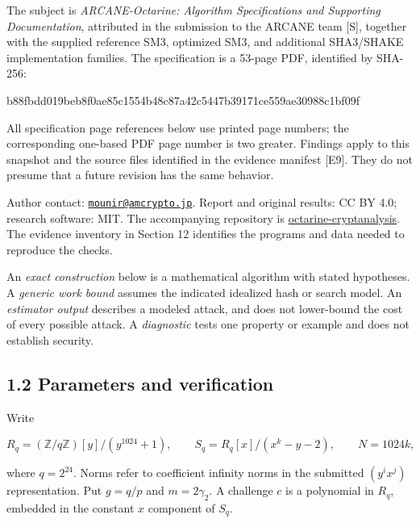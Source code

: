 \documentclass[
  american,
  10pt,
  a4paper,
]{article}
\newenvironment{Shaded}{}{}
\newcommand{\NormalTok}[1]{#1}
\begin{document}
The subject is \emph{ARCANE-Octarine: Algorithm Specifications and
Supporting Documentation}, attributed in the submission to the ARCANE
team {[}S{]}, together with the supplied reference SM3, optimized SM3,
and additional SHA3/SHAKE implementation families. The specification is
a 53-page PDF, identified by SHA-256:

\begin{Shaded}
\begin{Highlighting}[]
\NormalTok{b88fbdd019beb8f0ae85c1554b48c87a42c5447b39171ce559ae30988c1bf09f}
\end{Highlighting}
\end{Shaded}

All specification page references below use printed page numbers; the
corresponding one-based PDF page number is two greater. Findings apply
to this snapshot and the source files identified in the evidence
manifest {[}E9{]}. They do not presume that a future revision has the
same behavior.

Author contact:
\href{mailto:mounir@amcrypto.jp}{\nolinkurl{mounir@amcrypto.jp}}. Report
and original results: CC BY 4.0; research software: MIT. The
accompanying repository is
\href{https://github.com/amcrypto-jp/octarine-cryptanalysis}{octarine-cryptanalysis}.
The evidence inventory in Section 12 identifies the programs and data
needed to reproduce the checks.

An \emph{exact construction} below is a mathematical algorithm with
stated hypotheses. A \emph{generic work bound} assumes the indicated
idealized hash or search model. An \emph{estimator output} describes a
modeled attack, and does not lower-bound the cost of every possible
attack. A \emph{diagnostic} tests one property or example and does not
establish security.

\subsection{1.2 Parameters and
verification}\label{parameters-and-verification}

Write

\[
R_q=(\mathbb Z/q\mathbb Z)[y]/(y^{1024}+1),\qquad
S_q=R_q[x]/(x^k-y-2),\qquad N=1024k,
\]

where \(q=2^{24}\). Norms refer to coefficient infinity norms in the
submitted \((y^i x^j)\) representation. Put \(g=q/p\) and
\(m=2\gamma_2\). A challenge \(c\) is a polynomial in \(R_q\), embedded
in the constant \(x\) component of \(S_q\).
\end{document}
